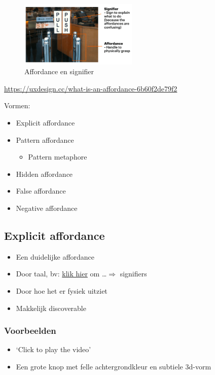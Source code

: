 \documentclass{article}
\begin{document}
\begin{figure}[H]
    \centering
    \includegraphics[width=0.5\textwidth]{affordance-vs-signifier.png}
    \caption{Affordance en signifier}
\end{figure}

\url{https://uxdesign.cc/what-is-an-affordance-6b60f2de79f2}


Vormen: 

\begin{itemize}
    \item Explicit affordance
    \item Pattern affordance
    \begin{itemize}
        \item Pattern metaphore
    \end{itemize}
    \item Hidden affordance
    \item False affordance
    \item Negative affordance
\end{itemize}


\subsection{Explicit affordance}
\begin{itemize}
    \item Een duidelijke affordance
    \item Door taal, bv: \underline{klik hier} om \dots $\Rightarrow$ signifiers
    \item Door hoe het er fysiek uitziet
    \item Makkelijk discoverable
\end{itemize}

\subsubsection{Voorbeelden}

\begin{itemize}
    \item `Click to play the video'
    \item Een grote knop met felle achtergrondkleur en subtiele 3d-vorm
\end{itemize}
\end{document}
